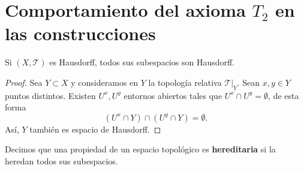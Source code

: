 \section{Comportamiento del axioma $\displaystyle T_{2} $ en las construcciones}
\begin{prop}
Si $\displaystyle \left(X, \mathcal{T}\right) $ es Hausdorff, todos sus subespacios son Hausdorff. 
\end{prop}
\begin{proof}
Sea $\displaystyle Y \subset X $ y consideramos en $\displaystyle Y $ la topología relativa $\displaystyle \mathcal{T}|_{Y} $. Sean $\displaystyle x,y \in Y $ puntos distintos. Existen $\displaystyle U^{x}, U^{y} $ entornos abiertos tales que $\displaystyle U^{x} \cap U^{y} = \emptyset $, de esta forma 
\[\left(U^{x} \cap Y\right) \cap \left(U^{y} \cap Y\right) = \emptyset .\]
Así, $\displaystyle Y $ también es espacio de Hausdorff. 
\end{proof}
\begin{notation}
	Decimos que una propiedad de un espacio topológico es \textbf{hereditaria} si la heredan todos sus subespacios. 
\end{notation}

